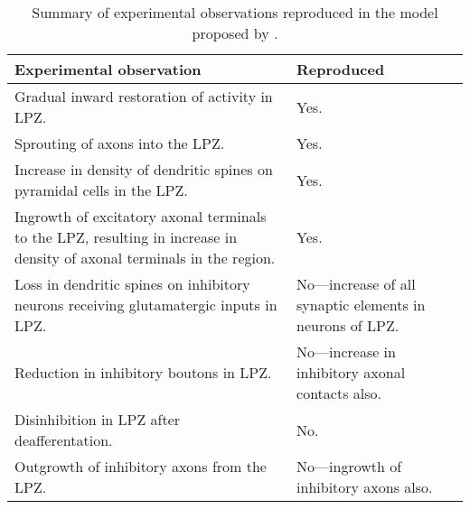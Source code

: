 \tiny{
\begin{table}[t]
  \centering
  \caption{Summary of experimental observations reproduced in the model proposed by \textcite{Butz2013}.}\label{tab:butz-results}
  \begin{tabularx}{\textwidth}{XX}
    \toprule%
    \textbf{Experimental observation} & \textbf{Reproduced} \\
    \midrule%
    \midrule%
    Gradual inward restoration of activity in LPZ\@. & Yes. \\
    \midrule%
    Sprouting of axons into the LPZ\@. & Yes. \\
    \midrule%
    Increase in density of dendritic spines on pyramidal cells in the LPZ\@. & Yes. \\
    \midrule%
    Ingrowth of excitatory axonal terminals to the LPZ, resulting in increase in density of axonal terminals in the region. & Yes. \\
    \midrule%
    Loss in dendritic spines on inhibitory neurons receiving glutamatergic inputs in LPZ\@. & No---increase of all synaptic elements in neurons of LPZ\@. \\
    \midrule%
    Reduction in inhibitory boutons in LPZ\@. & No---increase in inhibitory axonal contacts also.  \\
    \midrule%
    Disinhibition in LPZ after deafferentation. & No. \\
    \midrule%
    Outgrowth of inhibitory axons from the LPZ\@. & No---ingrowth of inhibitory axons also. \\
    \bottomrule%
  \end{tabularx}
\end{table}
}
